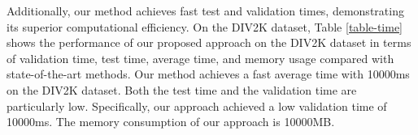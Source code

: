 \documentclass[10pt,twocolumn,letterpaper]{article}
\begin{document}
Additionally, our method achieves fast test and validation times, demonstrating its superior computational efficiency. On the DIV2K dataset, Table \ref{table-time} shows the performance of our proposed approach on the DIV2K dataset in terms of validation time, test time, average time, and memory usage compared with state-of-the-art methods. Our method achieves a fast average time with 10000ms on the DIV2K dataset. Both the test time and the validation time are particularly low. Specifically, our approach achieved a low validation time of 10000ms. The memory consumption of our approach is 10000MB.

\begin{table}[h]
  \centering
  \caption{Results.   Ours is better.}
  \label{tab:example}
\end{table}

\end{document}
